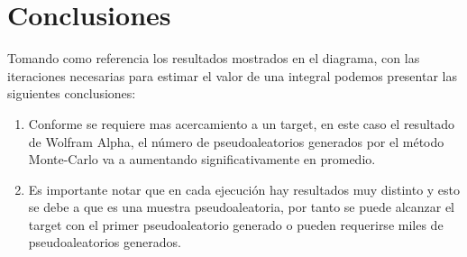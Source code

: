 \documentclass{article}
\begin{document}
\section{Conclusiones}
Tomando como referencia los resultados mostrados en el diagrama, con las iteraciones necesarias para estimar el valor de una integral podemos presentar las siguientes conclusiones:

\begin{enumerate}
\item Conforme se requiere mas acercamiento a un target, en este caso el resultado de Wolfram Alpha, el número de pseudoaleatorios generados por el método Monte-Carlo va a aumentando significativamente en promedio.	
\item Es importante notar que en cada ejecución hay resultados muy distinto y esto se debe a que es una muestra pseudoaleatoria, por tanto se puede alcanzar el target con el primer pseudoaleatorio generado o pueden requerirse miles de pseudoaleatorios generados. 
\end{enumerate}



\end{document}
